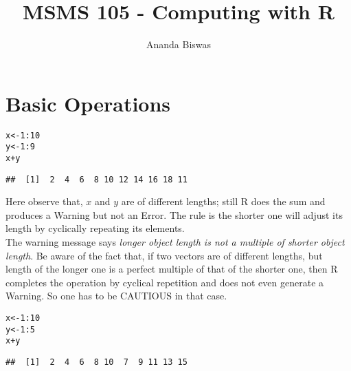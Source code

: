 \documentclass[11pt, a4paper]{article}\usepackage[]{graphicx}\usepackage[]{xcolor}
\title{\textbf{MSMS 105 - Computing with R}}
\author{Ananda Biswas}
\date{}
\makeatletter
\newcommand{\hlnum}[1]{\textcolor[rgb]{0.686,0.059,0.569}{#1}}%
\newcommand{\hlopt}[1]{\textcolor[rgb]{0,0,0}{#1}}%
\newcommand{\hldef}[1]{\textcolor[rgb]{0.345,0.345,0.345}{#1}}%
\newcommand{\hlkwb}[1]{\textcolor[rgb]{0.69,0.353,0.396}{#1}}%
\newenvironment{kframe}{%
 \def\at@end@of@kframe{}%
 \ifinner\ifhmode%
  \def\at@end@of@kframe{\end{minipage}}%
  \begin{minipage}{\columnwidth}%
 \fi\fi%
 \def\FrameCommand##1{\hskip\@totalleftmargin \hskip-\fboxsep
 \colorbox{shadecolor}{##1}\hskip-\fboxsep
     \hskip-\linewidth \hskip-\@totalleftmargin \hskip\columnwidth}%
 \MakeFramed {\advance\hsize-\width
   \@totalleftmargin\z@ \linewidth\hsize
   \@setminipage}}%
 {\par\unskip\endMakeFramed%
 \at@end@of@kframe}
\newenvironment{knitrout}{}{} %
\makeatother
\begin{document}
\maketitle

\tableofcontents

\newpage



\section{Basic Operations}

\smallpencil

\begin{knitrout}
\color{fgcolor}\begin{kframe}
\begin{alltt}
\hldef{x} \hlkwb{<-} \hlnum{1}\hlopt{:}\hlnum{10}
\hldef{y} \hlkwb{<-} \hlnum{1}\hlopt{:}\hlnum{9}
\hldef{x} \hlopt{+} \hldef{y}
\end{alltt}


{\ttfamily\noindent\color{warningcolor}{\#\# Warning in x + y: longer object length is not a multiple of shorter object length}}\begin{verbatim}
##  [1]  2  4  6  8 10 12 14 16 18 11
\end{verbatim}
\end{kframe}
\end{knitrout}

Here observe that, $x$ and $y$ are of different lengths; still R does the sum and produces a Warning but not an Error. The rule is the shorter one will adjust its length by cyclically repeating its elements. \\

\hspace{1cm}The warning message says \textit{longer object length is not a multiple of shorter object length}. Be aware of the fact that, if two vectors are of different lengths, but length of the longer one is a perfect multiple of that of the shorter one, then R completes the operation by cyclical repetition and does not even generate a Warning. So one has to be CAUTIOUS in that case.
\begin{knitrout}
\color{fgcolor}\begin{kframe}
\begin{alltt}
\hldef{x} \hlkwb{<-} \hlnum{1}\hlopt{:}\hlnum{10}
\hldef{y} \hlkwb{<-} \hlnum{1}\hlopt{:}\hlnum{5}
\hldef{x} \hlopt{+} \hldef{y}
\end{alltt}
\begin{verbatim}
##  [1]  2  4  6  8 10  7  9 11 13 15
\end{verbatim}
\end{kframe}
\end{knitrout}
\end{document}
